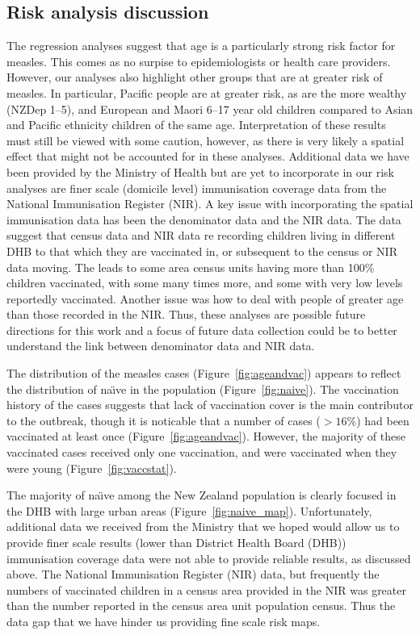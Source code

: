 \documentclass{article}
\begin{document}
\begin{itemize}
\subsection{Risk analysis discussion}

The regression analyses suggest that age is a particularly strong risk factor for measles. This comes as no surpise to epidemiologists or health care providers. However, our analyses also highlight other groups that are at greater risk of measles. In particular, Pacific people are at greater risk, as are the more wealthy (NZDep 1--5), and European and Maori 6--17 year old children compared to Asian and Pacific ethnicity children of the same age. Interpretation of these results must still be viewed with some caution, however, as there is very likely a spatial effect that might not be accounted for in these analyses. Additional data we have been provided by the Ministry of Health but are yet to incorporate in our risk analyses are finer scale (domicile level) immunisation coverage data from the National Immunisation Register (NIR). A key issue with incorporating the spatial immunisation data has been the denominator data and the NIR data. The data suggest that census data and NIR data re recording children living in different DHB to that which they are vaccinated in, or subsequent to the census or NIR data moving. The leads to some area census units having more than 100\% children vaccinated, with some many times more, and some with very low levels reportedly vaccinated. Another issue was how to deal with people of greater age than those recorded in the NIR. Thus, these analyses are possible future directions for this work and a focus of future data collection could be to better understand the link between denominator data and NIR data. 

The distribution of the measles cases (Figure~\ref{fig:ageandvac}) appears to reflect the distribution of na\"{\i}ve in the population (Figure~\ref{fig:naive}). The vaccination history of the cases suggests that lack of vaccination cover is the main contributor to the outbreak, though it is noticable that a number of cases ($>16\%$) had been vaccinated at least once (Figure~\ref{fig:ageandvac}). However, the majority of these vaccinated cases received only one vaccination, and were vaccinated when they were young (Figure~\ref{fig:vaccstat}). 

The majority of na\"{\i}ve among the New Zealand population is clearly focused in the DHB with large urban areas (Figure~\ref{fig:naive_map}). Unfortunately, additional data we received from the Ministry that we hoped would allow us to provide finer scale results (lower than District Health Board (DHB)) immunisation coverage data were not able to provide reliable results, as discussed above. The National Immunisation Register (NIR) data, but frequently the numbers of vaccinated children in a census area provided in the NIR was greater than the number reported in the census area unit population census. Thus the data gap that we have hinder us providing fine scale risk maps.


\end{itemize}
\end{document}
